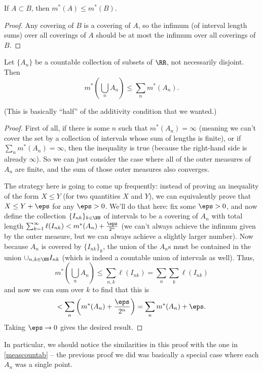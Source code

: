 \begin{lemma}
If $A \subset B$, then $m^\ast(A) \le m^\ast(B)$.
\end{lemma}
\begin{proof}
Any covering of $B$ is a covering of $A$, so the infimum (of interval length sums) over all coverings of $A$ should be at most the infimum over all coverings of $B$. 
\end{proof}

\begin{theorem}
Let $\{A_n\}$ be a countable collection of subsets of $\RR$, not necessarily disjoint. Then 
\[
    m^\ast\left(\bigcup_n A_n \right) \le \sum_n m^\ast(A_n).
\]  
\end{theorem}

(This is basically ``half'' of the additivity condition that we wanted.)

\begin{proof}
First of all, if there is some $n$ such that $m^\ast(A_n) = \infty$ (meaning we can't cover the set by a collection of intervals whose sum of lengths is finite), or if $\sum_n m^\ast(A_n) = \infty$, then the inequality is true (because the right-hand side is already $\infty$). So we can just consider the case where all of the outer measures of $A_n$ are finite, and the sum of those outer measures also converges. 

The strategy here is going to come up frequently: instead of proving an inequality of the form $X \le Y$ (for two quantities $X$ and $Y$), we can equivalently prove that $ X \le Y + \eps$ for any $\eps > 0$. We'll do that here: fix some $\eps > 0$, and now define the collection $\{I_{nk}\}_{k \in \NN}$ of intervals to be a covering of $A_n$ with total length $\sum_{k=1}^{\infty} \ell(I_{nk}) < m^\ast(A_n) + \frac{\eps}{2^n}$ (we can't always achieve the infimum given by the outer measure, but we can always achieve a slightly larger number). Now because $A_n$ is covered by $\{I_{nk}\}_k$, the union of the $A_n$s must be contained in the union $\cup_{n, k \in \NN} I_{nk}$ (which is indeed a countable union of intervals as well). Thus, 
\[
    m^\ast\left(\bigcup_{n} A_n\right) \le \sum_{n,k} \ell(I_{nk}) = \sum_n \sum_k \ell(I_{nk})
\]
and now we can sum over $k$ to find that this is
\[
    < \sum_n \left(m^\ast(A_n) + \frac{\eps}{2^n}\right) = \sum_n m^\ast(A_n) + \eps.
\]
Taking $\eps \to 0$ gives the desired result.
\end{proof}

In particular, we should notice the similarities in this proof with the one in \cref{meascountab} -- the previous proof we did was basically a special case where each $A_n$ was a single point.

